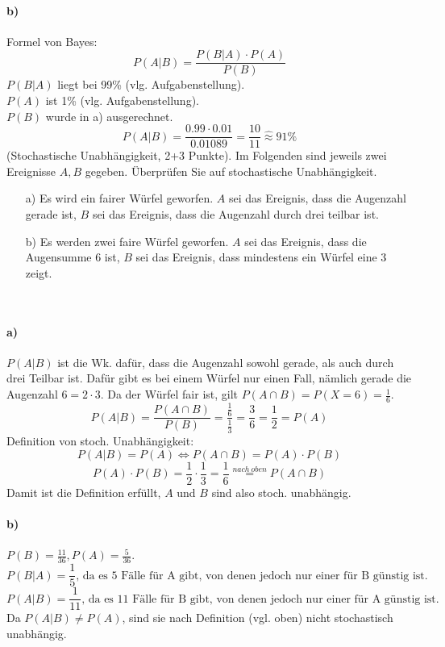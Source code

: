 \documentclass[twoside]{article}
\begin{document}
\paragraph{b)}
Formel von Bayes:
\[
	P(A|B)=\frac{P(B|A)\cdot P(A)}{P(B)}
\]
$P(B|A)$ liegt bei 99\% (vlg. Aufgabenstellung).\\
$P(A)$ ist 1\% (vlg. Aufgabenstellung).\\
$P(B)$ wurde in a) ausgerechnet.
\[
	P(A|B)=\frac{0.99\cdot0.01}{0.01089}=\frac{10}{11}\hat{\approx}91\%
\]
(Stochastische Unabhängigkeit, 2+3 Punkte).
Im Folgenden sind jeweils zwei Ereignisse $A,B$ gegeben.
Überprüfen Sie auf stochastische Unabhängigkeit.
\begin{enumerate}
	\item[a)] Es wird ein fairer Würfel geworfen.
	$A$ sei das Ereignis, dass die Augenzahl gerade ist, $B$ sei das Ereignis, dass die Augenzahl durch drei teilbar ist.
	\item[b)] Es werden zwei faire Würfel geworfen.
	$A$ sei das Ereignis, dass die Augensumme 6 ist, $B$ sei das Ereignis, dass mindestens ein Würfel eine 3 zeigt.
\end{enumerate}
\vspace{.3cm}\-\\
\paragraph{a)} $P(A|B)$ ist die Wk. dafür, dass die Augenzahl sowohl gerade, als auch durch drei Teilbar ist.
Dafür gibt es bei einem Würfel nur einen Fall, nämlich gerade die Augenzahl $6=2\cdot3$.
Da der Würfel fair ist, gilt $P(A\cap B)=P(X=6)=\frac{1}{6}$.
\[
	P(A|B)=\frac{P(A\cap B)}{P(B)}=\frac{\frac{1}{6}}{\frac{1}{3}}=\frac{3}{6}=\frac{1}{2}=P(A)
\]
Definition von stoch. Unabhängigkeit:
\[
	P(A|B)=P(A) \Leftrightarrow P(A \cap B) = P(A) \cdot P(B)
\]
\[
	P(A) \cdot P(B) = \frac{1}{2} \cdot \frac{1}{3} = \frac{1}{6} \overset{nach~oben}{=}P(A\cap B)
\]
Damit ist die Definition erfüllt, $A$ und $B$ sind also stoch. unabhängig.
\paragraph{b)}
$P(B)=\frac{11}{36}, P(A)=\frac{5}{36}$.
\[
	P(B|A)=\frac{1}{5}\text{, da es 5 Fälle für A gibt, von denen jedoch nur einer für B günstig ist.}
\]
\[
	P(A|B)=\frac{1}{11}\text{, da es 11 Fälle für B gibt, von denen jedoch nur einer für A günstig ist.}
\]
Da $P(A|B) \neq P(A)$, sind sie nach Definition (vgl. oben) nicht stochastisch unabhängig.
\end{document}
